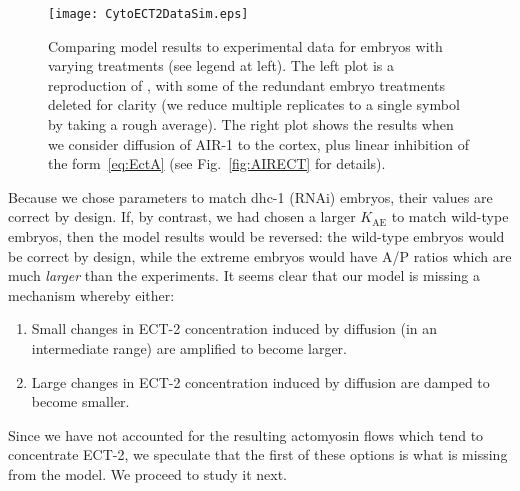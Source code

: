 \documentclass[11pt]{article}
\begin{document}
\begin{figure}
\centering
\texttt{[image: CytoECT2DataSim.eps]}
\caption{\label{fig:DiffCSep} Comparing model results to experimental data for embryos with varying treatments (see legend at left). The left plot is a reproduction of \cite[Fig.~7A]{longhini2022aurora}, with some of the redundant embryo treatments deleted for clarity (we reduce multiple replicates to a single symbol by taking a rough average). The right plot shows the results when we consider diffusion of AIR-1 to the cortex, plus linear inhibition of the form\ \eqref{eq:EctA} (see Fig.\ \ref{fig:AIRECT} for details).}
\end{figure}

Because we chose parameters to match dhc-1 (RNAi) embryos, their values are correct by design. If, by contrast, we had chosen a larger $K_\text{AE}$ to match wild-type embryos, then the model results would be reversed: the wild-type embryos would be correct by design, while the extreme embryos would have A/P ratios which are much \emph{larger} than the experiments. 
It seems clear that our model is missing a mechanism whereby either:
\begin{enumerate}
\item Small changes in ECT-2 concentration induced by diffusion (in an intermediate range) are amplified to become larger.
\item Large changes in ECT-2 concentration induced by diffusion are damped to become smaller.
\end{enumerate}
Since we have not accounted for the resulting actomyosin flows which tend to concentrate ECT-2, we speculate that the first of these options is what is missing from the model. We proceed to study it next.
\end{document}
